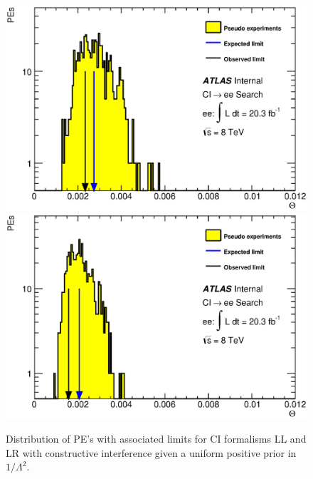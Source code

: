     \begin{figure}[h]
        \begin{center}
            \includegraphics[scale=0.4]{images/ee__LL_minus_L2/Theta.eps}
            \includegraphics[scale=0.4]{images/ee__LR_minus_L2/Theta.eps}
        \end{center}
       \caption{Distribution of PE's with associated limits for CI formalisms LL and LR with constructive interference given a uniform positive prior in $1/\Lambda^{2}$.}
       \label{fig:Theta_CI_main}
    \end{figure}




